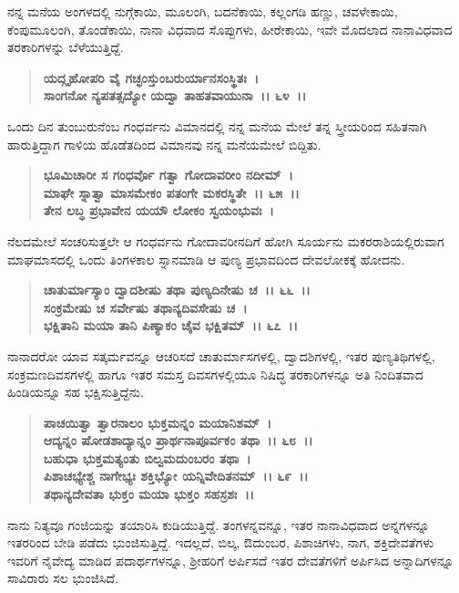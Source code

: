 ನನ್ನ ಮನೆಯ ಅಂಗಳದಲ್ಲಿ ನುಗ್ಗೆಕಾಯಿ, ಮೂಲಂಗಿ, ಬದನೆಕಾಯಿ, ಕಲ್ಲಂಗಡಿ ಹಣ್ಣು, ಚವಳೇಕಾಯಿ, ಕೆಂಪುಮೂಲಂಗಿ, ತೊಂಡೆಕಾಯಿ, ನಾನಾ ವಿಧವಾದ ಸೊಪ್ಪುಗಳು, ಹೀರೇಕಾಯಿ, ಇವೇ ಮೊದಲಾದ ನಾನಾವಿಧವಾದ ತರಕಾರಿಗಳನ್ನು ಬೆಳೆಯುತ್ತಿದ್ದೆ.

\begin{verse}
\textbf{ಯದ್ಗೃಹೋಪರಿ ವೈ ಗಚ್ಛಂಸ್ತುಂಬರುರ್ಯಾನಸಂಸ್ಥಿತಃ~।}\\\textbf{ಸಾಂಗನೋ ನ್ಯಪತತ್ಸದ್ಯೋ ಯದ್ವಾ ತಾಹತವಾಯುನಾ~।। ೬೪~।।}
\end{verse}

ಒಂದು ದಿನ ತುಂಬುರುನೆಂಬ ಗಂಧರ್ವನು ವಿಮಾನದಲ್ಲಿ ನನ್ನ ಮನೆಯ ಮೇಲೆ ತನ್ನ ಸ್ತ್ರೀಯರಿಂದ ಸಹಿತನಾಗಿ ಹಾರುತ್ತಿದ್ದಾಗ ಗಾಳಿಯ ಹೊಡೆತದಿಂದ ವಿಮಾನವು ನನ್ನ ಮನೆಯಮೇಲೆ ಬಿದ್ದಿತು.

\begin{verse}
\textbf{ಭೂಮಿಚಾರೀ ಸ ಗಂಧರ್ವೊ ಗತ್ವಾ ಗೋದಾವರೀಂ ನದೀಮ್~।}\\\textbf{ಮಾಘೇ ಸ್ನಾತ್ವಾ ಮಾಸಮೇಕಂ ಪತಂಗೇ ಮಕರಸ್ಥಿತೇ~।। ೬೫~।। }\\\textbf{ತೇನ ಲಬ್ಧ ಪ್ರಭಾವೇನ ಯಯೌ ಲೋಕಂ ಸ್ವಯಂಭುವಃ~।}
\end{verse}

ನೆಲದಮೇಲೆ ಸಂಚರಿಸುತ್ತಲೇ ಆ ಗಂಧರ್ವನು ಗೋದಾವರೀನದಿಗೆ ಹೋಗಿ ಸೂರ್ಯನು ಮಕರರಾಶಿಯಲ್ಲಿರುವಾಗ ಮಾಘಮಾಸದಲ್ಲಿ ಒಂದು ತಿಂಗಳಕಾಲ ಸ್ನಾನಮಾಡಿ ಆ ಪುಣ್ಯ ಪ್ರಭಾವದಿಂದ ದೇವಲೋಕಕ್ಕೆ ಹೋದನು.

\begin{verse}
\textbf{ಚಾತುರ್ಮಾಸ್ಯಾಂ ದ್ವಾದಶೀಷು ತಥಾ ಪುಣ್ಯದಿನೇಷು ಚ~।। ೬೬~।।}\\\textbf{ಸಂಕ್ರಮೇಷು ಚ ಸರ್ವೇಷು ತಥಾನ್ಯದಿವಸೇಷು ಚ~। }\\\textbf{ಭಕ್ಷಿತಾನಿ ಮಯಾ ತಾನಿ ಪಿಣ್ಯಾಕಂ ಚೈವ ಭಕ್ಷಿತಮ್~।। ೬೭~।।}
\end{verse}

ನಾನಾದರೋ ಯಾವ ಸತ್ಕರ್ಮವನ್ನೂ ಆಚರಿಸದೆ ಚಾತುರ್ಮಾಸಗಳಲ್ಲಿ, ದ್ವಾದಶಿಗಳಲ್ಲಿ, ಇತರ ಪುಣ್ಯತಿಥಿಗಳಲ್ಲಿ, ಸಂಕ್ರಮಣದಿವಸಗಳಲ್ಲಿ ಹಾಗೂ ಇತರ ಸಮಸ್ತ ದಿವಸಗಳಲ್ಲಿಯೂ ನಿಷಿದ್ಧ ತರಕಾರಿಗಳನ್ನೂ ಅತಿ ನಿಂದಿತವಾದ ಹಿಂಡಿಯನ್ನೂ ಸಹ ಭಕ್ಷಿಸುತ್ತಿದ್ದೆನು.

\begin{verse}
\textbf{ಪಾಚಯಿತ್ವಾ ತ್ವಾರನಾಲಂ ಭುಕ್ತಮನ್ನಂ ಮಯಾನಿಶಮ್~।}\\\textbf{ಆದ್ಯನ್ನಂ ಷೋಡಶಾದ್ಯಾನ್ನಂ ಪ್ರಾರ್ಥನಾಪೂರ್ವಕಂ ತಥಾ~।। ೬೮~।। }\\\textbf{ಬಹುಧಾ ಭುಕ್ತಮತ್ಯಂತು ಬಿಲ್ವಮದುಂಬರಂ ತಥಾ~।}\\\textbf{ಪಿಶಾಚಭ್ಯೇಶ್ಚ ನಾಗೇಭ್ಯಃ ಶಕ್ತಿಭ್ಯೋ ಯನ್ನಿವೇದಿತನಮ್~।। ೬೯~।।} \\\textbf{ತಥಾನ್ಯದೇವತಾ ಭುಕ್ತಂ ಮಯಾ ಭುಕ್ತಂ ಸಹಸ್ರಶಃ~।।}
\end{verse}

ನಾನು ನಿತ್ಯವೂ ಗಂಜಿಯನ್ನು ತಯಾರಿಸಿ ಕುಡಿಯುತ್ತಿದ್ದೆ. ತಂಗಳನ್ನವನ್ನೂ, ಇತರ ನಾನಾವಿಧವಾದ ಅನ್ನಗಳನ್ನೂ ಇತರರಿಂದ ಬೇಡಿ ಪಡೆದು ಭುಂಜಿಸುತ್ತಿದ್ದೆ. ಇದಲ್ಲದೆ, ಬಿಲ್ಕ, ಔದುಂಬರ, ಪಿಶಾಚಿಗಳು, ನಾಗ, ಶಕ್ತಿದೇವತೆಗಳು ಇವರಿಗೆ ನೈವೇದ್ಯ ಮಾಡಿದ ಪದಾರ್ಥಗಳನ್ನೂ, ಶ‍್ರೀಹರಿಗೆ ಅರ್ಪಿಸದೆ ಇತರ ದೇವತೆಗಳಿಗೆ ಅರ್ಪಿಸಿದ ಅನ್ನಾದಿಗಳನ್ನೂ ಸಾವಿರಾರು ಸಲ ಭುಂಜಿಸಿದೆ.

